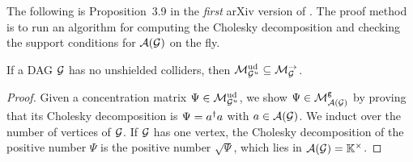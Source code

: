 The following is Proposition~3.9 in the \emph{first} arXiv version of \cite{RDAG}. The proof method is to run an algorithm for computing the Cholesky decomposition and checking the support conditions for $\mathcal{A}(\mathcal{G})$ on the fly.

\begin{prop}\label{prop:CONinDAG}
	If a DAG $\mathcal{G}$ has no unshielded colliders, then $\mathcal{M}^{\mathrm{ud}}_{\mathcal{G}^u} \subseteq \mathcal{M}_{\mathcal{G}}^{\to}$.
\end{prop}

\begin{proof}
	Given a concentration matrix $\Psi \in \mathcal{M}^{\mathrm{ud}}_{\mathcal{G}^u}$, we show $\Psi \in \mathcal{M}^{\mathtt{g}}_{\mathcal{A}(\mathcal{G})}$ by proving that its Cholesky decomposition is $\Psi = a^{\dagger} a$ with $a \in \mathcal{A}(\mathcal{G})$. %
	We induct over the number of vertices of $\mathcal{G}$. If $\mathcal{G}$ has one vertex, the Cholesky decomposition of the positive number $\Psi$ is the positive number $\sqrt{\Psi}$, which lies in $\mathcal{A}(\mathcal{G}) = \mathbb K^\times$.
	

\end{proof}
